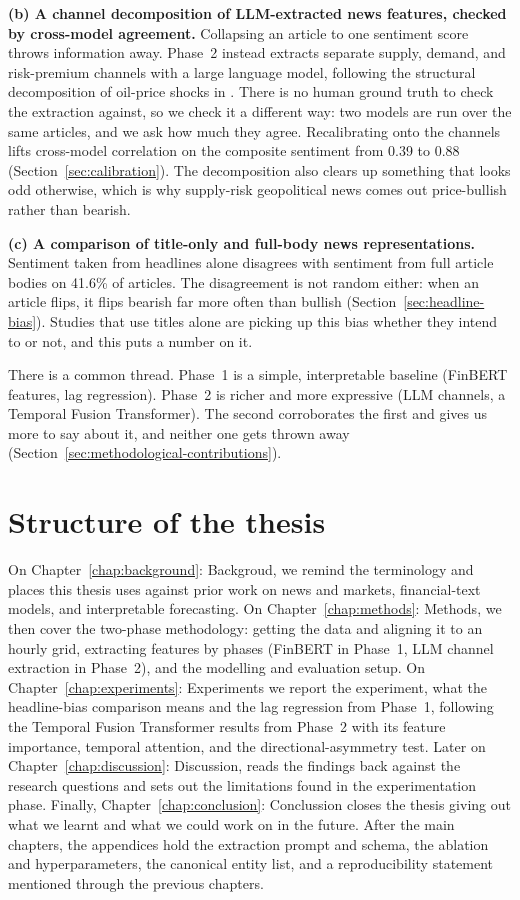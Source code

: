 \textbf{(b) A channel decomposition of LLM-extracted news features, checked by cross-model agreement.} Collapsing an article to one sentiment score throws information away. Phase~2 instead extracts separate supply, demand, and risk-premium channels with a large language model, following the structural decomposition of oil-price shocks in \citet{kilian2009}. There is no human ground truth to check the extraction against, so we check it a different way: two models are run over the same articles, and we ask how much they agree. Recalibrating onto the channels lifts cross-model correlation on the composite sentiment from 0.39 to 0.88 (Section~\ref{sec:calibration}). The decomposition also clears up something that looks odd otherwise, which is why supply-risk geopolitical news comes out price-bullish rather than bearish.

\textbf{(c) A comparison of title-only and full-body news representations.} Sentiment taken from headlines alone disagrees with sentiment from full article bodies on 41.6\% of articles. The disagreement is not random either: when an article flips, it flips bearish far more often than bullish (Section~\ref{sec:headline-bias}). Studies that use titles alone are picking up this bias whether they intend to or not, and this puts a number on it.

There is a common thread. Phase~1 is a simple, interpretable baseline (FinBERT features, lag regression). Phase~2 is richer and more expressive (LLM channels, a Temporal Fusion Transformer). The second corroborates the first and gives us more to say about it, and neither one gets thrown away (Section~\ref{sec:methodological-contributions}).

\section{Structure of the thesis}\label{sec:thesis-structure}

On Chapter~\ref{chap:background}: Backgroud, we remind the terminology and places this thesis uses against prior work on news and markets, financial-text models, and interpretable forecasting. On Chapter~\ref{chap:methods}: Methods, we then cover the two-phase methodology: getting the data and aligning it to an hourly grid, extracting features by phases (FinBERT in Phase~1, LLM channel extraction in Phase~2), and the modelling and evaluation setup. On Chapter~\ref{chap:experiments}: Experiments we report the experiment, what the headline-bias comparison means and the lag regression from Phase~1, following the Temporal Fusion Transformer results from Phase~2 with its feature importance, temporal attention, and the directional-asymmetry test. Later on Chapter~\ref{chap:discussion}: Discussion, reads the findings back against the research questions and sets out the limitations found in the experimentation phase. Finally, Chapter~\ref{chap:conclusion}: Conclussion closes the thesis giving out what we learnt and what we could work on in the future. After the main chapters, the appendices hold the extraction prompt and schema, the ablation and hyperparameters, the canonical entity list, and a reproducibility statement mentioned through the previous chapters.
